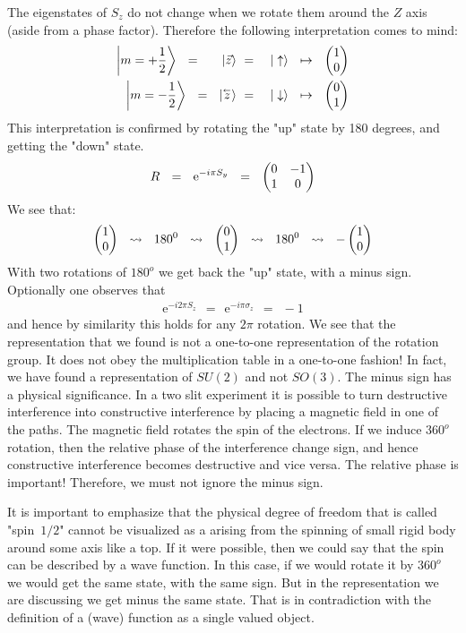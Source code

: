 \documentclass[onecolumn,fleqn, 11pt]{revtex4}
\newcommand{\vecb}[1]{\overset{{}_{\leftarrow}}{#1}}
\newcommand{\eexp}{\mathrm{e}^}
\newcommand{\amatrix}[1]{\begin{matrix} #1 \end{matrix}}
\newcommand{\beq}{\begin{eqnarray}}
\newcommand{\eeq}{\end{eqnarray}}
\begin{document}
The eigenstates of ${S_z}$ 
do not change when we rotate them around 
the $Z$ axis (aside from a phase factor). 
Therefore the following interpretation comes to mind: 
\beq
\left|m=+\frac{1}{2}\right\rangle
\ \ = \ \ 
\ \ \ |\vec{z} \rangle 
& \ = \ & 
| \uparrow \rangle  
\ \ \mapsto \ \ 
\left( \amatrix{1 \cr 0} \right)
\\ 
\left|m=-\frac{1}{2}\right\rangle 
\ \ = \ \ 
| \vecb{z} \rangle 
& \ = \ & 
| \downarrow \rangle 
\ \ \mapsto \ \  
\left( \amatrix{0 \cr 1} \right)
\eeq
This interpretation is confirmed by rotating 
the "up" state by 180 degrees, and getting the "down" state. 
\beq
R \ \ = \ \ \eexp{-i{\pi}S_y} \ \  = \ \ \left(\amatrix{0 & -1 \cr 1 & 0 } \right) 
\eeq
We see that:
\beq
\left( \amatrix{ 1 \cr 0} \right) 
\ \ \leadsto  \ \ 180^{0} 
\ \ \leadsto  \ \  { \left(\amatrix{0\cr 1}\right) } 
\ \ \leadsto  \ \  180^{0} 
\ \ \leadsto  \ \  - \left(\amatrix{1\cr 0}\right) 
\eeq
With two rotations of $180^o$  we get back the "up" state, with a minus sign.
Optionally one observes that 
\beq
\eexp{-i 2\pi S_z} \ \ = \ \ \eexp{-i{\pi}\sigma_z} \ \ = \ \ -1 
\eeq
and hence by similarity this holds for any $2\pi$ rotation.
We see that the representation that we found is not 
a one-to-one representation of the rotation group. 
It does not obey the multiplication table in 
a one-to-one fashion! In fact, we have found a representation 
of $SU(2)$ and not $SO(3)$. The minus sign has a physical significance. 
In a two slit experiment it is possible to turn destructive 
interference into constructive interference by placing 
a magnetic field in one of the paths. The magnetic field 
rotates the spin of the electrons. 
If we induce $360^o$ rotation, then the relative 
phase of the interference change sign, 
and hence constructive interference becomes 
destructive and vice versa. The relative phase is important! 
Therefore, we must not ignore the minus sign. 



It is important to emphasize that the physical degree of freedom 
that is called "spin~$1/2$" cannot be visualized  
as a arising from the spinning of small rigid body 
around some axis like a top. 
If it were possible, then we could say that the spin 
can be described by a wave function. In this case, 
if we would rotate it by ${360^o}$ we would get 
the same state, with the same sign. But in the representation 
we are discussing we get minus the same state. 
That is in contradiction with the definition of a (wave) function 
as a single valued object. 
\end{document}
